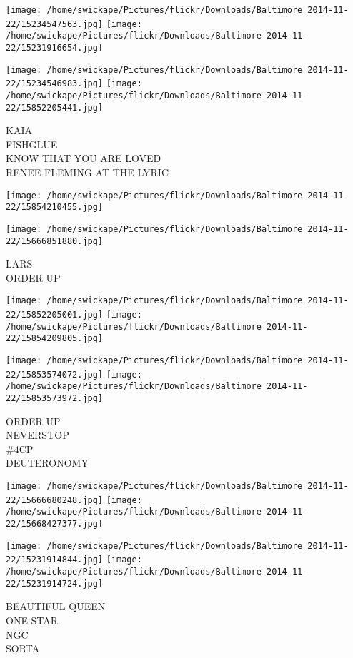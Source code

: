 \documentclass[10pt,letterpaper]{article}
\begin{document}
\texttt{[image: /home/swickape/Pictures/flickr/Downloads/Baltimore 2014-11-22/15234547563.jpg]}
\texttt{[image: /home/swickape/Pictures/flickr/Downloads/Baltimore 2014-11-22/15231916654.jpg]}

\texttt{[image: /home/swickape/Pictures/flickr/Downloads/Baltimore 2014-11-22/15234546983.jpg]}
\texttt{[image: /home/swickape/Pictures/flickr/Downloads/Baltimore 2014-11-22/15852205441.jpg]}

KAIA\\
FISHGLUE\\
KNOW THAT YOU ARE LOVED\\
RENEE FLEMING AT THE LYRIC
\pagebreak

\texttt{[image: /home/swickape/Pictures/flickr/Downloads/Baltimore 2014-11-22/15854210455.jpg]}

\vspace{0.25in}
\texttt{[image: /home/swickape/Pictures/flickr/Downloads/Baltimore 2014-11-22/15666851880.jpg]}

LARS\\
ORDER UP
\pagebreak

\texttt{[image: /home/swickape/Pictures/flickr/Downloads/Baltimore 2014-11-22/15852205001.jpg]}
\texttt{[image: /home/swickape/Pictures/flickr/Downloads/Baltimore 2014-11-22/15854209805.jpg]}

\texttt{[image: /home/swickape/Pictures/flickr/Downloads/Baltimore 2014-11-22/15853574072.jpg]}
\texttt{[image: /home/swickape/Pictures/flickr/Downloads/Baltimore 2014-11-22/15853573972.jpg]}

ORDER UP\\
NEVERSTOP\\
\#4CP\\
DEUTERONOMY
\pagebreak

\texttt{[image: /home/swickape/Pictures/flickr/Downloads/Baltimore 2014-11-22/15666680248.jpg]}
\texttt{[image: /home/swickape/Pictures/flickr/Downloads/Baltimore 2014-11-22/15668427377.jpg]}

\texttt{[image: /home/swickape/Pictures/flickr/Downloads/Baltimore 2014-11-22/15231914844.jpg]}
\texttt{[image: /home/swickape/Pictures/flickr/Downloads/Baltimore 2014-11-22/15231914724.jpg]}

BEAUTIFUL QUEEN\\
ONE STAR\\
NGC\\
SORTA
\pagebreak
\end{document}
